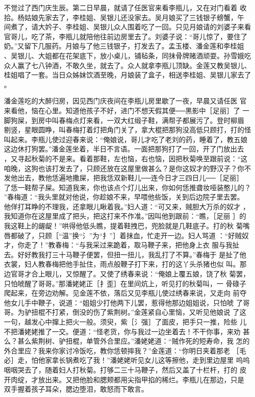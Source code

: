 不觉过了西门庆生辰。第二日早晨，就请了任医官来看李瓶儿，又在对门看着
收拾。杨姑娘先家去了，李桂姐、吴银儿还没家去。吴月娘买了三钱银子螃蟹，午
间煮了，请大妗子、李桂姐、吴银儿众人围着吃了一回。只见月娘请的刘婆子来看
官哥儿，吃了茶，李瓶儿就陪他往前边房里去了。刘婆子说：“哥儿惊了，要住了
奶。”又留下几服药。月娘与了他三钱银子，打发去了。孟玉楼、潘金莲和李桂姐
、吴银儿、大姐都在花架底下，放小桌儿，铺毡条，同抹骨牌赌酒顽耍。孙雪娥吃
众人赢了七八钟酒，不敢久坐，就去了。众人就拿李瓶儿顶缺。金莲又教吴银儿、
桂姐唱了一套。当日众姊妹饮酒至晚，月娘装了盒子，相送李桂姐、吴银儿家去了
。

潘金莲吃的大醉归房，因见西门庆夜间在李瓶儿房里歇了一夜，早晨又请任医
官来看他，恼在心里。知道他孩子不好，进门不想天假其便──黑影中［足丽］了
一脚狗屎，到房中叫春梅点灯来看，一双大红缎子鞋，满帮子都展污了。登时柳眉
剔竖，星眼圆睁，叫春梅打着灯把角门关了，拿大棍把那狗没高低只顾打，打的怪
叫起来。李瓶儿使过迎春来说：“俺娘说，哥儿才吃了老刘的药，睡着了，教五娘
这边休打狗罢。”潘金莲坐着，半日不言语。一面把那狗打了一回，开了门放出去
，又寻起秋菊的不是来。看着那鞋，左也恼，右也恼，因把秋菊唤至跟前说：“这
咱晚，这狗也该打发去了，只顾还放在这屋里做甚么？是你这奴才的野汉子？你不
发他出去，教他恁遍地撒屎，把我恁双新鞋儿──连今日才三四日儿──［足丽］
了恁一鞋帮子屎。知道我来，你也该点个灯儿出来，你如何恁推聋妆哑装憨儿的？
”春梅道：“我头里就对他说，你趁娘不来，早喂他些饭，关到后边院子里去罢。
他佯打耳睁的不理我，还拿眼儿瞅着我。”妇人道：“可又来，贼胆大万杀的奴才
，我知道你在这屋里成了把头，把这打来不作准。”因叫他到跟前：“瞧，［足丽
］的我这鞋上的龌龊！”哄得他低头瞧，提着鞋拽巴，兜脸就是几鞋底子。打的秋
菊嘴唇都破了，只顾［“温”换“氵”为“扌”］着抹血，忙走开一边。妇人骂道
：“好贼奴才，你走了！”教春梅：“与我采过来跪着，取马鞭子来，把他身上衣
服与我扯去。好好教我打三十马鞭子便罢，但扭一扭儿，我乱打了不算。”春梅于
是扯了他衣裳，妇人教春梅把他手扯住，雨点般鞭子打下来，打的这丫头杀猪也似
叫。那边官哥才合上眼儿，又惊醒了。又使了绣春来说：“俺娘上覆五娘，饶了秋
菊罢，只怕唬醒了哥哥。”那潘姥姥正［扌歪］在里间炕上，听见打的秋菊叫，一
骨碌子爬起来，在旁边劝解。见金莲不依，落后又见李瓶儿使过绣春来说，又走向
前夺他女儿手中鞭子，说道：“姐姐少打他两下儿罢，惹得他那边姐姐说，只怕唬
了哥哥。为驴扭棍不打紧，倒没的伤了紫荆树。”金莲紧自心里恼，又听见他娘说
了这一句，越发心中撺上把火一般。须臾，紫［氵强］了面皮，把手只一推，险些
儿不把潘姥姥推了一交。便道：“怪老货，你与我过一边坐着去！不干你事，来劝
甚么？甚么紫荆树、驴扭棍，单管外合里应。”潘姥姥道：“贼作死的短寿命，我
怎的外合里应？我来你家讨冷饭吃，教你恁顿摔我？”金莲道：“你明日夹着那老
［毛必］走，怕他家拿长锅煮吃了我！”潘姥姥听见女儿这等擦他，走到里边屋里
呜呜咽咽哭去了，随着妇人打秋菊。打够二三十马鞭子，然后又盖了十栏杆，打的
皮开肉绽，才放出来。又把他脸和腮颊都用尖指甲掐的稀烂。李瓶儿在那边，只是
双手握着孩子耳朵，腮边堕泪，敢怒而下敢言。

